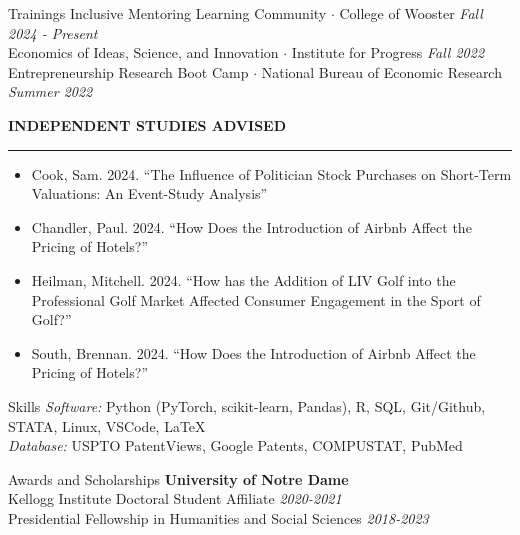 \documentclass{resume} %
\begin{document}
\begin{rSection}{Trainings}
	Inclusive Mentoring Learning Community $\cdot$ College of Wooster \hfill {\em Fall 2024 - Present} \\
	Economics of Ideas, Science, and Innovation $\cdot$ Institute for Progress  \hfill {\em Fall 2022} \\
	Entrepreneurship Research Boot Camp $\cdot$ National Bureau of Economic Research \hfill {\em Summer 2022}
\end{rSection}

\sectionskip
\MakeUppercase{\textbf{Independent Studies Advised}}
\sectionlineskip
\hrule
\begin{itemize}[leftmargin=1.5em]
\setlength\itemsep{-0.2em}
	\item [] Cook, Sam. 2024. ``The Influence of Politician Stock Purchases on Short-Term Valuations: An Event-Study Analysis''
	\item[] Chandler, Paul. 2024. ``How Does the Introduction of Airbnb Affect the
Pricing of Hotels?'' 
	\item[] Heilman, Mitchell. 2024. ``How has the Addition of LIV Golf into the Professional Golf Market Affected Consumer Engagement in the Sport of Golf?''
	\item[] South, Brennan. 2024. ``How Does the Introduction of Airbnb Affect the
Pricing of Hotels?''
\end{itemize}


\begin{rSection}{Skills}
\textit{Software:} Python (PyTorch, scikit-learn, Pandas), R, SQL, Git/Github, STATA, Linux, VSCode, \LaTeX \\
\textit{Database:} USPTO PatentViews, Google Patents, COMPUSTAT, PubMed
\end{rSection}
 
\begin{rSection}{Awards and Scholarships}
	{\bf University of Notre Dame}  \\ 
	Kellogg Institute Doctoral Student Affiliate \hfill {\em 2020-2021} \\
	Presidential Fellowship in Humanities and Social Sciences \hfill {\em 2018-2023}
\end{rSection}
\end{document}
